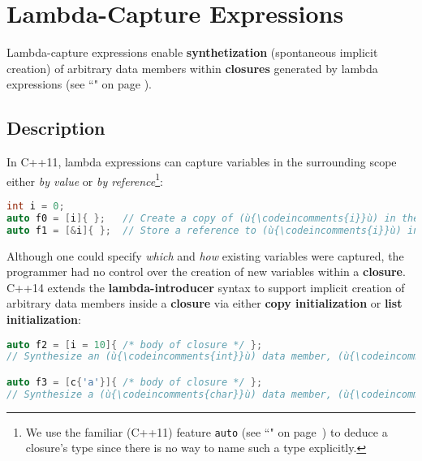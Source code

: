 \newpage
\section[Lambda Captures]{Lambda-Capture Expressions}\label{lambda-capture-expressions}


Lambda-capture expressions enable \textbf{synthetization} (spontaneous implicit creation) of
arbitrary data members within \textbf{closures} generated by
lambda expressions (see ``" on page \pageref{lambda}).

\subsection[Description]{Description}\label{description}

In C++11, lambda expressions can capture variables in the
surrounding scope either \emph{by value} or \emph{by reference}{\cprotect\footnote{We use the familiar (C++11) feature
\texttt{auto} (see ``" on page~\pageref{auto-feature}) to deduce a closure's type since there is no
way to name such a type explicitly.}}:

\begin{lstlisting}[language=C++]
int i = 0;
auto f0 = [i]{ };   // Create a copy of (ù{\codeincomments{i}}ù) in the generated closure named (ù{\codeincomments{f0}}ù).
auto f1 = [&i]{ };  // Store a reference to (ù{\codeincomments{i}}ù) in the generated closure named (ù{\codeincomments{f1}}ù).
\end{lstlisting}

\noindent Although one could specify \emph{which} and \emph{how} existing
variables were captured, the programmer had no control over the creation
of new variables within a \textbf{closure}. C++14 extends the
\textbf{lambda-introducer} syntax to support implicit creation of
arbitrary data members inside a \textbf{closure} via either \textbf{copy
initialization} or \textbf{list initialization}:

\begin{lstlisting}[language=C++]
auto f2 = [i = 10]{ /* body of closure */ };
// Synthesize an (ù{\codeincomments{int}}ù) data member, (ù{\codeincomments{i}}ù), initialized with (ù{\codeincomments{10}}ù) in the closure.

auto f3 = [c{'a'}]{ /* body of closure */ };
// Synthesize a (ù{\codeincomments{char}}ù) data member, (ù{\codeincomments{c}}ù), initialized with (ù{\codeincomments{'a'}}ù) in the closure.
\end{lstlisting}

